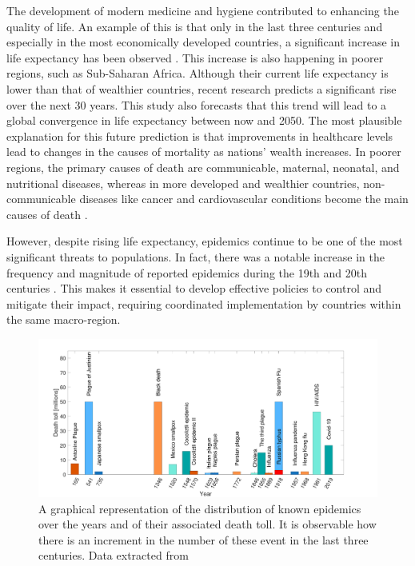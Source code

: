 The development of modern medicine and hygiene contributed to enhancing the quality of life. An example of this is that only in the last three centuries and especially in the most economically developed countries, a significant increase in life expectancy has been observed \cite{Anderson_82}.
This increase is also happening in poorer regions, such as Sub-Saharan Africa. Although their current life expectancy is lower than that of wealthier countries, recent research \cite{Vollset_2024} predicts a significant rise over the next 30 years. This study also forecasts that this trend will lead to a global convergence in life expectancy between now and 2050.
The most plausible explanation for this future prediction is that improvements in healthcare levels lead to changes in the causes of mortality as nations' wealth increases. In poorer regions, the primary causes of death are communicable, maternal, neonatal, and nutritional diseases, whereas in more developed and wealthier countries, non-communicable diseases like cancer and cardiovascular conditions become the main causes of death \cite{eurostat}.

However, despite rising life expectancy, epidemics continue to be one of the most significant threats to populations. In fact, there was a notable increase in the frequency and magnitude of reported epidemics during the 19th and 20th centuries \cite{Anderson_82}. This makes it essential to develop effective policies to control and mitigate their impact, requiring coordinated implementation by countries within the same macro-region.
\begin{figure}[h]
	\centering
	\includegraphics[width=0.95\linewidth]{0_introduction/images_introduction/worst_epidemic}
	\caption[Epidemic distribution in time]{A graphical representation of the distribution of known epidemics over the years and of their associated death toll. It is observable how there is an increment in the number of these event in the last three centuries. Data extracted from \cite{owid_historical_pandemics,wiki_pandemics}}
	\label{fig:worstepidemic}
\end{figure}

